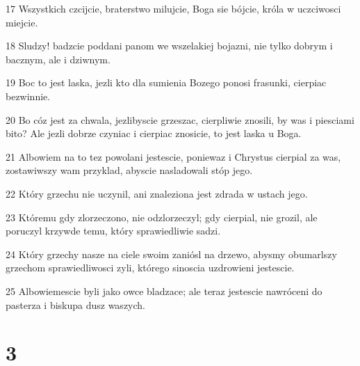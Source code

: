 \par 17 Wszystkich czcijcie, braterstwo milujcie, Boga sie bójcie, króla w uczciwosci miejcie.
\par 18 Sludzy! badzcie poddani panom we wszelakiej bojazni, nie tylko dobrym i bacznym, ale i dziwnym.
\par 19 Boc to jest laska, jezli kto dla sumienia Bozego ponosi frasunki, cierpiac bezwinnie.
\par 20 Bo cóz jest za chwala, jezlibyscie grzeszac, cierpliwie znosili, by was i piesciami bito? Ale jezli dobrze czyniac i cierpiac znosicie, to jest laska u Boga.
\par 21 Albowiem na to tez powolani jestescie, poniewaz i Chrystus cierpial za was, zostawiwszy wam przyklad, abyscie nasladowali stóp jego.
\par 22 Który grzechu nie uczynil, ani znaleziona jest zdrada w ustach jego.
\par 23 Któremu gdy zlorzeczono, nie odzlorzeczyl; gdy cierpial, nie grozil, ale poruczyl krzywde temu, który sprawiedliwie sadzi.
\par 24 Który grzechy nasze na ciele swoim zaniósl na drzewo, abysmy obumarlszy grzechom sprawiedliwosci zyli, którego sinoscia uzdrowieni jestescie.
\par 25 Albowiemescie byli jako owce bladzace; ale teraz jestescie nawróceni do pasterza i biskupa dusz waszych.

\chapter{3}

